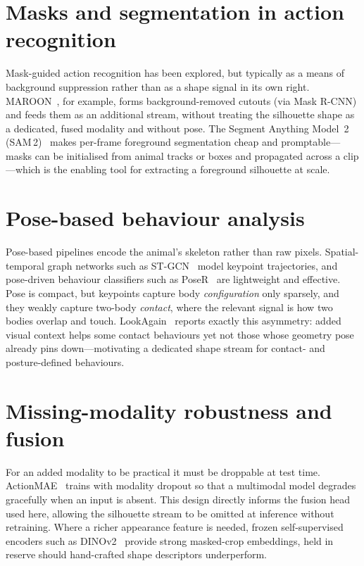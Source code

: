 \documentclass[12pt,a4paper]{report}
\begin{document}
\section{Masks and segmentation in action recognition}
\label{sec:masks}
Mask-guided action recognition has been explored, but typically as a means of
background suppression rather than as a shape signal in its own right. MAROON~\cite{maroon},
for example, forms background-removed cutouts (via Mask R-CNN) and feeds them as an
additional stream, without treating the silhouette shape as a dedicated, fused modality and
without pose. The Segment Anything Model~2 (SAM\,2)~\cite{sam2} makes per-frame foreground
segmentation cheap and promptable---masks can be initialised from animal tracks or boxes and
propagated across a clip---which is the enabling tool for extracting a foreground silhouette
at scale.

\section{Pose-based behaviour analysis}
\label{sec:pose}
Pose-based pipelines encode the animal's skeleton rather than raw pixels. Spatial-temporal
graph networks such as ST-GCN~\cite{stgcn} model keypoint trajectories, and pose-driven
behaviour classifiers such as PoseR~\cite{poser} are lightweight and effective. Pose is
compact, but keypoints capture body \emph{configuration} only sparsely, and they weakly
capture two-body \emph{contact}, where the relevant signal is how two bodies overlap and
touch. LookAgain~\cite{lookagain} reports exactly this asymmetry: added visual context helps
some contact behaviours yet not those whose geometry pose already pins down---motivating a
dedicated shape stream for contact- and posture-defined behaviours.

\section{Missing-modality robustness and fusion}
\label{sec:fusion}
For an added modality to be practical it must be droppable at test time. ActionMAE~\cite{actionmae}
trains with modality dropout so that a multimodal model degrades gracefully when an input is
absent. This design directly informs the fusion head used here, allowing the silhouette
stream to be omitted at inference without retraining. Where a richer appearance feature is
needed, frozen self-supervised encoders such as DINOv2~\cite{dinov2} provide strong
masked-crop embeddings, held in reserve should hand-crafted shape descriptors underperform.
\end{document}
